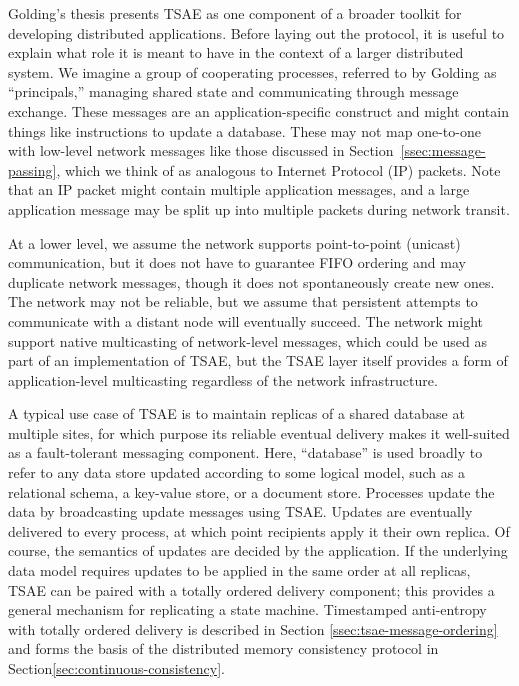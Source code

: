 \documentclass[]             %
{NASA}                       %
\theoremstyle{definition}
\begin{document}
Golding's thesis \cite{1992:golding-thesis} presents TSAE as one
component of a broader toolkit for developing distributed
applications. Before laying out the protocol, it is useful to explain
what role it is meant to have in the context of a larger distributed
system. We imagine a group of cooperating processes, referred to by
Golding as ``principals,'' managing shared state and communicating
through message exchange. These messages are an application-specific
construct and might contain things like instructions to update a
database. These may not map one-to-one with low-level network messages
like those discussed in Section~\ref{ssec:message-passing}, which we
think of as analogous to Internet Protocol (IP) packets. Note that an
IP packet might contain multiple application messages, and a large
application message may be split up into multiple packets during
network transit.

At a lower level, we assume the network supports point-to-point
(unicast) communication, but it does not have to guarantee FIFO
ordering and may duplicate network messages, though it does not
spontaneously create new ones. The network may not be reliable, but we
assume that persistent attempts to communicate with a distant node
will eventually succeed. The network might support native multicasting
of network-level messages, which could be used as part of an
implementation of TSAE, but the TSAE layer itself provides a form of
application-level multicasting regardless of the network
infrastructure.

A typical use case of TSAE is to maintain replicas of a shared
database at multiple sites, for which purpose its reliable eventual
delivery makes it well-suited as a fault-tolerant messaging
component. Here, ``database'' is used broadly to refer to any data
store updated according to some logical model, such as a relational
schema, a key-value store, or a document store. Processes update the
data by broadcasting update messages using TSAE. Updates are
eventually delivered to every process, at which point recipients apply
it their own replica. Of course, the semantics of updates are decided
by the application. If the underlying data model requires updates to
be applied in the same order at all replicas, TSAE can be paired with
a totally ordered delivery component; this provides a general
mechanism for replicating a state machine. Timestamped anti-entropy
with totally ordered delivery is described in Section
\ref{ssec:tsae-message-ordering} and forms the basis of the
distributed memory consistency protocol in
Section\ref{sec:continuous-consistency}.
\end{document}
